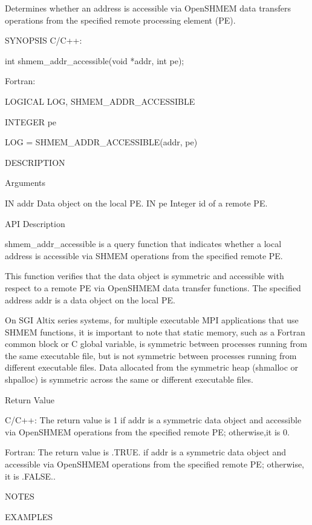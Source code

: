        Determines whether an address is accessible via OpenSHMEM data transfers operations from the specified  remote  processing
       element (PE).

SYNOPSIS
       C/C++:

	  int shmem_addr_accessible(void *addr, int pe);

       Fortran:

	  LOGICAL LOG, SHMEM_ADDR_ACCESSIBLE

	  INTEGER pe

	  LOG = SHMEM_ADDR_ACCESSIBLE(addr, pe)

DESCRIPTION

Arguments

       IN	addr	Data object on the local PE.
       IN	pe	Integer id of a remote PE.

API Description

       shmem_addr_accessible  is  a  query  function  that indicates whether a
       local address is accessible via SHMEM  operations  from	the  specified
       remote PE.

       This function verifies that the data object is symmetric and accessible
       with respect to a remote PE via OpenSHMEM  data  transfer  functions.   The
       specified address addr is a data object on the local PE.

       On  SGI	Altix series systems, for multiple executable MPI applications
       that use SHMEM functions, it is important to note that  static  memory,
       such  as	 a  Fortran  common  block  or C global variable, is symmetric
       between processes running from the same executable  file,  but  is  not
       symmetric  between  processes  running from different executable files.
       Data allocated from  the	 symmetric  heap  (shmalloc  or	 shpalloc)  is
       symmetric across the same or different executable files.

Return Value

       C/C++:	 The  return value is 1 if addr is a symmetric data object and
		 accessible via OpenSHMEM operations from the specified remote PE;
		 otherwise,it is 0.

       Fortran:	 The return value is .TRUE. if addr is a symmetric data object
		 and accessible via OpenSHMEM operations from the specified remote
		 PE; otherwise, it is .FALSE..

NOTES

EXAMPLES


